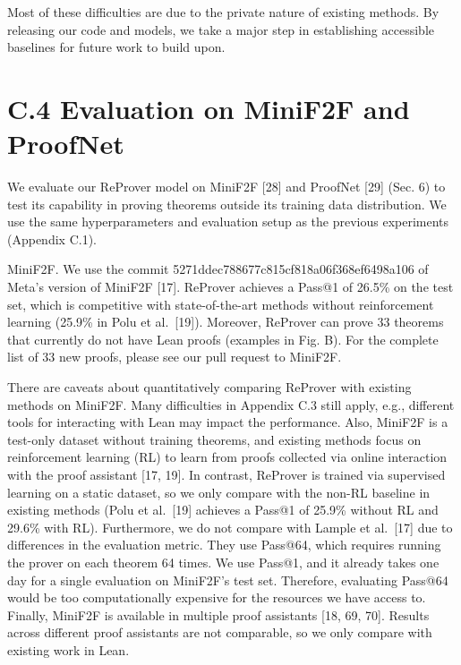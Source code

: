 \documentclass[
]{article}
\begin{document}
Most of these difficulties are due to the private nature of existing
methods. By releasing our code and models, we take a major step in
establishing accessible baselines for future work to build upon.

\section{C.4 Evaluation on MiniF2F and
ProofNet}\label{c.4-evaluation-on-minif2f-and-proofnet}

We evaluate our ReProver model on MiniF2F {[}28{]} and ProofNet {[}29{]}
(Sec. 6) to test its capability in proving theorems outside its training
data distribution. We use the same hyperparameters and evaluation setup
as the previous experiments (Appendix C.1).

MiniF2F. We use the commit 5271ddec788677c815cf818a06f368ef6498a106 of
Meta's version of MiniF2F {[}17{]}. ReProver achieves a Pass@1 of 26.5\%
on the test set, which is competitive with state-of-the-art methods
without reinforcement learning (25.9\% in Polu et al.~{[}19{]}).
Moreover, ReProver can prove 33 theorems that currently do not have Lean
proofs (examples in Fig. B). For the complete list of 33 new proofs,
please see our pull request to MiniF2F.

There are caveats about quantitatively comparing ReProver with existing
methods on MiniF2F. Many difficulties in Appendix C.3 still apply, e.g.,
different tools for interacting with Lean may impact the performance.
Also, MiniF2F is a test-only dataset without training theorems, and
existing methods focus on reinforcement learning (RL) to learn from
proofs collected via online interaction with the proof assistant {[}17,
19{]}. In contrast, ReProver is trained via supervised learning on a
static dataset, so we only compare with the non-RL baseline in existing
methods (Polu et al.~{[}19{]} achieves a Pass@1 of 25.9\% without RL and
29.6\% with RL). Furthermore, we do not compare with Lample et
al.~{[}17{]} due to differences in the evaluation metric. They use
Pass@64, which requires running the prover on each theorem 64 times. We
use Pass@1, and it already takes one day for a single evaluation on
MiniF2F's test set. Therefore, evaluating Pass@64 would be too
computationally expensive for the resources we have access to. Finally,
MiniF2F is available in multiple proof assistants {[}18, 69, 70{]}.
Results across different proof assistants are not comparable, so we only
compare with existing work in Lean.
\end{document}
